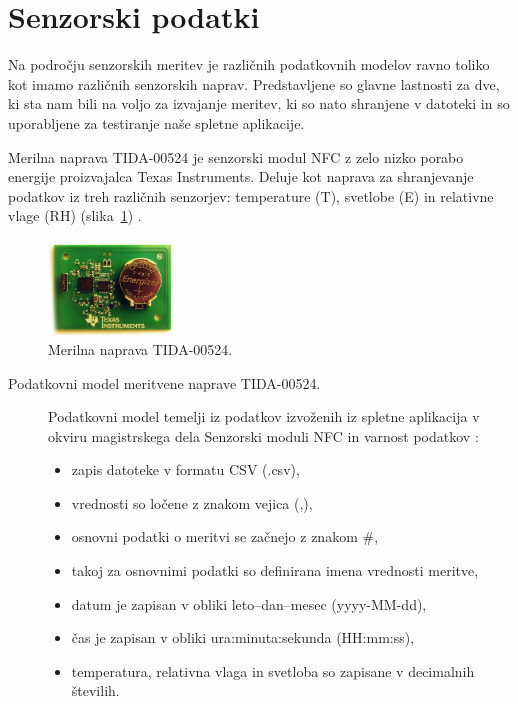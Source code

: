 \documentclass[a4paper, 12pt]{book}
\begin{document}
 
\clearpage

\section{Senzorski podatki}

Na področju senzorskih meritev je različnih podatkovnih modelov ravno toliko kot imamo različnih senzorskih naprav. Predstavljene so glavne lastnosti za dve, ki sta nam bili na voljo za izvajanje meritev, ki so nato shranjene v datoteki in so uporabljene za testiranje naše spletne aplikacije.

\vspace{5mm}

Merilna naprava TIDA-00524 je senzorski modul NFC z zelo nizko porabo energije proizvajalca Texas Instruments. Deluje kot naprava za shranjevanje podatkov iz treh različnih senzorjev: temperature (T), svetlobe (E) in relativne vlage (RH) (slika~\ref{merilna-naprava-tida}) \cite{dialoger-tida}.

\begin{figure}[h]
\begin{center}
\includegraphics[width=0.3\textwidth]{slike/merilna-naprava-tida.png}
\end{center}
\caption{Merilna naprava TIDA-00524.}
\label{merilna-naprava-tida}
\end{figure}


\begin{description}
\item[Podatkovni model meritvene naprave TIDA-00524.] Podatkovni model temelji iz podatkov izvoženih iz spletne aplikacija v okviru magistrskega dela Senzorski moduli NFC in varnost podatkov \cite{magistrska-crnigoj}:

\begin{itemize}
\item  zapis datoteke v formatu CSV (.csv),
\item  vrednosti so ločene z znakom vejica (,),
\item  osnovni podatki o meritvi se začnejo z znakom \#,
\item  takoj za osnovnimi podatki so definirana imena vrednosti meritve,
\item  datum je zapisan v obliki leto--dan--mesec (yyyy-MM-dd),
\item  čas je zapisan v obliki ura:minuta:sekunda (HH:mm:ss),
\item  temperatura, relativna vlaga in svetloba so zapisane v decimalnih številih.
\end{itemize}
\end{description}
\end{document}
